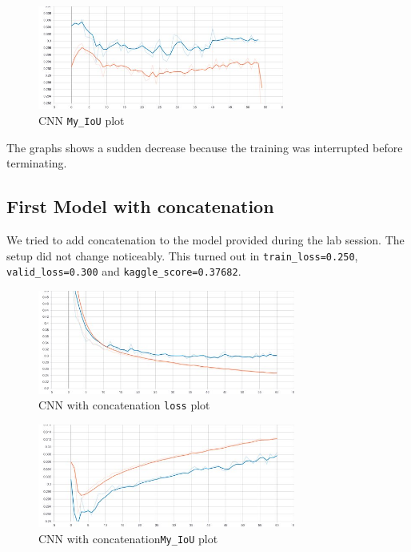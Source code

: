 \documentclass{article}
\begin{document}
		\begin{figure}[H]
			\centering
			\includegraphics[height=3.4cm, keepaspectratio]{First_Model_CNN_Dec04_19-24-31_epoch_my_IoU.jpg}
			\caption{CNN \texttt{My\_IoU} plot}
		\end{figure}
			
		The graphs shows a sudden decrease because the training was interrupted before terminating.
		
		\subsection{First Model with concatenation}
			We tried to add concatenation to the model provided during the lab session. The setup did not change noticeably. This turned out in \texttt{train\_loss=0.250}, \texttt{valid\_loss=0.300} and \texttt{kaggle\_score=0.37682}.
			
			\begin{figure}[H]
				\centering
				\includegraphics[height=3.4cm, keepaspectratio]{First_Model_conv_CNN_Dec06_20-49-34_epoch_loss.jpg}
				\caption{CNN with concatenation \texttt{loss} plot}
			\end{figure}
	
			\begin{figure}[H]
				\centering
				\includegraphics[height=3.4cm, keepaspectratio]{First_Model_conv_CNN_Dec06_20-49-34_epoch_my_IoU.jpg}
				\caption{CNN with concatenation\texttt{My\_IoU} plot}
			\end{figure}
			
\end{document}
